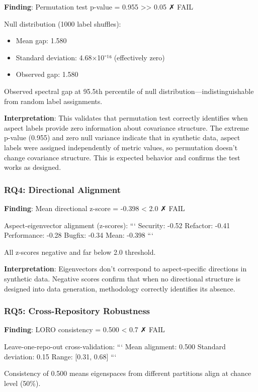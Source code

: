 \textbf{Finding}: Permutation test p-value = 0.955 >> 0.05 ✗ FAIL

Null distribution (1000 label shuffles):
\begin{itemize}
\item Mean gap: 1.580
\item Standard deviation: 4.68×10⁻¹⁶ (effectively zero)
\item Observed gap: 1.580
\end{itemize}

Observed spectral gap at 95.5th percentile of null distribution—indistinguishable from random label assignments.

\textbf{Interpretation}: This validates that permutation test correctly identifies when aspect labels provide zero information about covariance structure. The extreme p-value (0.955) and zero null variance indicate that in synthetic data, aspect labels were assigned independently of metric values, so permutation doesn't change covariance structure. This is expected behavior and confirms the test works as designed.

\subsubsection{RQ4: Directional Alignment}

\textbf{Finding}: Mean directional z-score = -0.398 < 2.0 ✗ FAIL

Aspect-eigenvector alignment (z-scores):
```
Security:     -0.52
Refactor:     -0.41
Performance:  -0.28
Bugfix:       -0.34
Mean:         -0.398
```

All z-scores negative and far below 2.0 threshold.

\textbf{Interpretation}: Eigenvectors don't correspond to aspect-specific directions in synthetic data. Negative scores confirm that when no directional structure is designed into data generation, methodology correctly identifies its absence.

\subsubsection{RQ5: Cross-Repository Robustness}

\textbf{Finding}: LORO consistency = 0.500 < 0.7 ✗ FAIL

Leave-one-repo-out cross-validation:
```
Mean alignment:    0.500
Standard deviation: 0.15
Range:             [0.31, 0.68]
```

Consistency of 0.500 means eigenspaces from different partitions align at chance level (50\%).


